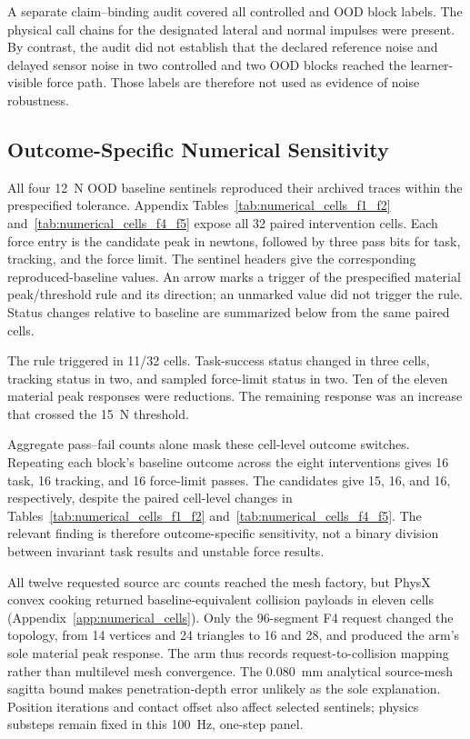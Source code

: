 A separate claim--binding audit covered all controlled and OOD block labels.
The physical call chains for the designated lateral and normal impulses were
present. By contrast, the audit did not establish that the declared reference
noise and delayed sensor noise in two controlled and two OOD blocks reached
the learner-visible force path. Those labels are therefore not used as
evidence of noise robustness.

\subsection{Outcome-Specific Numerical Sensitivity}

All four 12~N OOD baseline sentinels reproduced their archived traces within the
prespecified tolerance. Appendix Tables~\ref{tab:numerical_cells_f1_f2}
and~\ref{tab:numerical_cells_f4_f5} expose all 32 paired intervention cells.
Each force entry is the candidate peak in
newtons, followed by three pass bits for task, tracking, and the force limit.
The sentinel headers give the corresponding reproduced-baseline values. An
arrow marks a trigger of the prespecified material peak/threshold rule and its
direction; an unmarked value did not trigger the rule. Status changes relative
to baseline are summarized below from the same paired cells.

The rule triggered in 11/32 cells. Task-success status changed in three cells,
tracking status in two, and sampled force-limit status in two. Ten of the
eleven material peak responses were reductions. The remaining response was an
increase that crossed the 15~N threshold.

Aggregate pass--fail counts alone mask these cell-level outcome switches.
Repeating each block's
baseline outcome across the eight interventions gives 16 task, 16 tracking,
and 16 force-limit passes. The candidates give 15, 16, and 16, respectively,
despite the paired cell-level changes in
Tables~\ref{tab:numerical_cells_f1_f2} and~\ref{tab:numerical_cells_f4_f5}.
The relevant finding is therefore outcome-specific sensitivity, not a binary
division between invariant task results and unstable force results.

All twelve requested source arc counts reached the mesh factory, but PhysX
convex cooking returned baseline-equivalent collision payloads in eleven
cells (Appendix~\ref{app:numerical_cells}). Only the 96-segment F4 request
changed the topology, from 14 vertices and 24 triangles to 16 and 28, and produced the
arm's sole material peak response. The arm thus records request-to-collision
mapping rather than multilevel mesh convergence. The 0.080~mm analytical
source-mesh sagitta bound makes penetration-depth error unlikely as the sole explanation.
Position iterations and contact offset also affect selected sentinels; physics
substeps remain fixed in this 100~Hz, one-step panel.

